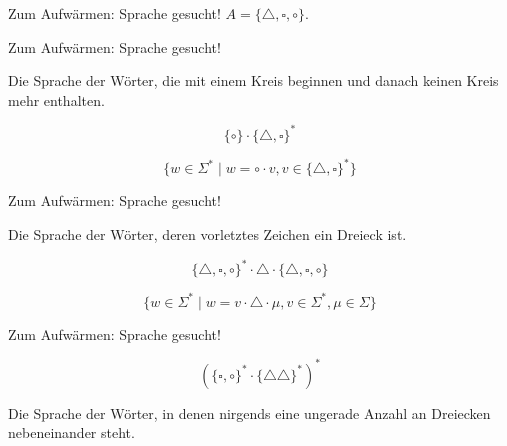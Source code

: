 \begin{frame}{Zum Aufwärmen: Sprache gesucht!} 
	$A = \{ \triangle, \square, \circ \}$.\\
\end{frame}

%	

\begin{frame}{Zum Aufwärmen: Sprache gesucht!}
	
	Die Sprache der Wörter, die mit einem Kreis beginnen und danach keinen Kreis mehr enthalten.
	\vspace{15mm}
	\pause
	
	$$ \{\circ\} \cdot \{\triangle, \square\}^* $$
	\vspace{15mm}
	\pause
	
	$$ \{w \in \Sigma^* \mid w = \circ \cdot v, v \in \{\triangle, \square\}^* \} $$

\end{frame}

\begin{frame}{Zum Aufwärmen: Sprache gesucht!}
	
	Die Sprache der Wörter, deren vorletztes Zeichen ein Dreieck ist.
	\vspace{15mm}
	\pause
	
	$$ \{\triangle, \square, \circ\}^* \cdot \triangle \cdot \{\triangle, \square, \circ\} $$
	\vspace{15mm}
	\pause

	$$ \{w \in \Sigma^* \mid w = v \cdot \triangle \cdot \mu, v \in \Sigma^*, \mu \in \Sigma \} $$

	
\end{frame}

\begin{frame}{Zum Aufwärmen: Sprache gesucht!}
	
	$$ (\{\square, \circ\}^* \cdot \{\triangle\triangle\}^* )^* $$
	\vspace{15mm}
	\pause

	Die Sprache der Wörter, in denen nirgends eine ungerade Anzahl an Dreiecken nebeneinander steht.
\end{frame}

